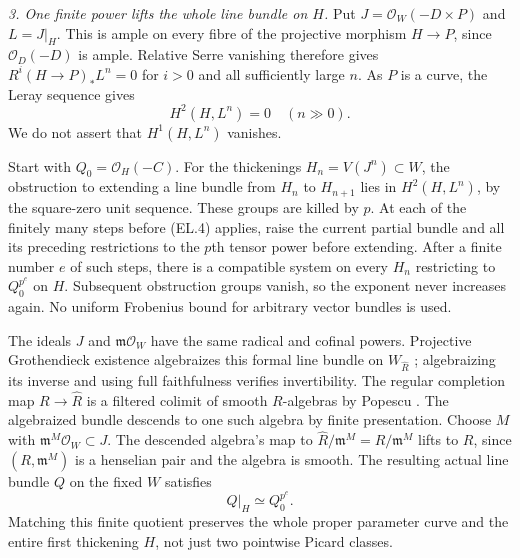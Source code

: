 \emph{3. One finite power lifts the whole line bundle on $H$.}
Put $J=\mathcal O_W(-D\times P)$ and
$L=J|_H$.  This is ample on every fibre of the projective morphism
$H\to P$, since $\mathcal O_D(-D)$ is ample.  Relative Serre
vanishing therefore gives $R^i(H\to P)_*L^n=0$ for $i>0$ and all
sufficiently large $n$.  As $P$ is a curve, the Leray sequence gives
\begin{equation}
                       H^2(H,L^n)=0\quad(n\gg0).
                                                        \tag{EL.4}
\end{equation}
We do not assert that $H^1(H,L^n)$ vanishes.

Start with $Q_0=\mathcal O_H(-C)$.  For the thickenings
$H_n=V(J^n)\subset W$, the obstruction to extending a line bundle
from $H_n$ to $H_{n+1}$ lies in $H^2(H,L^n)$, by the square-zero
unit sequence\citep[Lemma 37.4.1]{frC3azStacksPicThickening}.
These groups are killed by $p$.  At each of the finitely many
steps before (EL.4) applies, raise the current partial bundle and
all its preceding restrictions to the $p$th tensor power before
extending.  After a finite number $e$ of such steps, there is a
compatible system on every $H_n$ restricting to $Q_0^{p^e}$ on
$H$.  Subsequent obstruction groups vanish, so the exponent never
increases again.  No uniform Frobenius bound for arbitrary vector
bundles is used.

The ideals $J$ and $\mathfrak m\mathcal O_W$ have the same radical
and cofinal powers.  Projective Grothendieck existence algebraizes
this formal line bundle on $W_{\widehat R}$
\citep[Lemma 30.24.3]{frC3azStacksExistence}; algebraizing its inverse
and using full faithfulness verifies invertibility.  The regular
completion map $R\to\widehat R$ is a filtered colimit of smooth
$R$-algebras by Popescu
\citep[Lemma 15.51.14; Theorem 16.12.1]
{frC3azStacksCompletion,frC3azStacksPopescu}.
The algebraized bundle descends to one such algebra by finite
presentation\citep[Lemma 32.10.3(2)]{frC3azStacksLimitBundles}.
Choose $M$ with $\mathfrak m^M\mathcal O_W\subset J$.
The descended algebra's map to $\widehat R/\mathfrak m^M=R/\mathfrak m^M$
lifts to $R$, since $(R,\mathfrak m^M)$ is a henselian pair and the
algebra is smooth\citep[Lemma 15.13.3]{frC3azStacksHenselSmooth}.
The resulting actual line bundle $Q$ on the fixed $W$ satisfies
\begin{equation}
                            Q|_H\simeq Q_0^{p^e}.
                                                        \tag{EL.5}
\end{equation}
Matching this finite quotient preserves the whole proper parameter
curve and the entire first thickening $H$, not just two pointwise
Picard classes.

